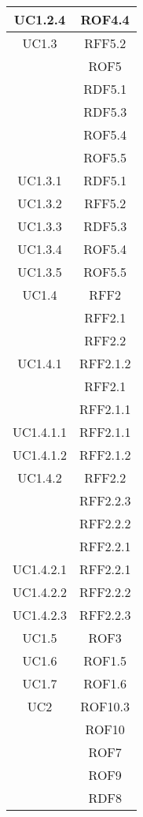 \begin{longtable}{|c|c|}
\midrule
UC1.2.4
& ROF4.4\\

\midrule
UC1.3
& RFF5.2\\
& ROF5\\
& RDF5.1\\
& RDF5.3\\
& ROF5.4\\
& ROF5.5\\

\midrule
UC1.3.1
& RDF5.1\\

\midrule
UC1.3.2
& RFF5.2\\

\midrule
UC1.3.3
& RDF5.3\\

\midrule
UC1.3.4
& ROF5.4\\

\midrule
UC1.3.5
& ROF5.5\\

\midrule
UC1.4
& RFF2\\
& RFF2.1\\
& RFF2.2\\

\midrule
UC1.4.1
& RFF2.1.2\\
& RFF2.1\\
& RFF2.1.1\\

\midrule
UC1.4.1.1
& RFF2.1.1\\

\midrule
UC1.4.1.2
& RFF2.1.2\\

\midrule
UC1.4.2
& RFF2.2\\
& RFF2.2.3\\
& RFF2.2.2\\
& RFF2.2.1\\

\midrule
UC1.4.2.1
& RFF2.2.1\\

\midrule
UC1.4.2.2
& RFF2.2.2\\

\midrule
UC1.4.2.3
& RFF2.2.3\\

\midrule
UC1.5
& ROF3\\

\midrule
UC1.6
& ROF1.5\\

\midrule
UC1.7
& ROF1.6\\

\midrule
UC2
& ROF10.3\\
& ROF10\\
& ROF7\\
& ROF9\\
& RDF8\\


\end{longtable}
